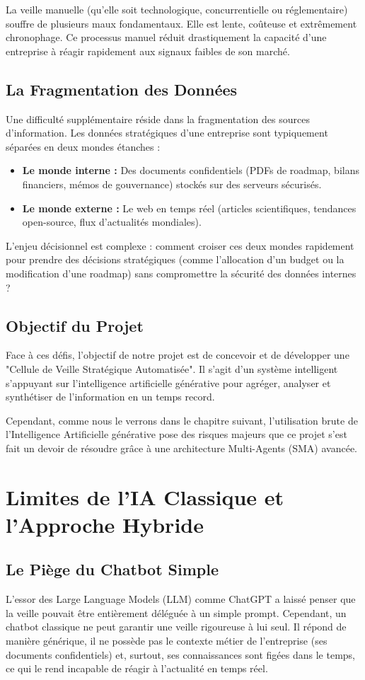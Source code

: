 \documentclass[12pt,a4paper]{report}
\begin{document}
La veille manuelle (qu'elle soit technologique, concurrentielle ou réglementaire) souffre de plusieurs maux fondamentaux. Elle est lente, coûteuse et extrêmement chronophage. Ce processus manuel réduit drastiquement la capacité d'une entreprise à réagir rapidement aux signaux faibles de son marché. 

\section{La Fragmentation des Données}
Une difficulté supplémentaire réside dans la fragmentation des sources d'information. Les données stratégiques d'une entreprise sont typiquement séparées en deux mondes étanches :
\begin{itemize}
    \item \textbf{Le monde interne :} Des documents confidentiels (PDFs de roadmap, bilans financiers, mémos de gouvernance) stockés sur des serveurs sécurisés.
    \item \textbf{Le monde externe :} Le web en temps réel (articles scientifiques, tendances open-source, flux d'actualités mondiales).
\end{itemize}

L'enjeu décisionnel est complexe : comment croiser ces deux mondes rapidement pour prendre des décisions stratégiques (comme l'allocation d'un budget ou la modification d'une roadmap) sans compromettre la sécurité des données internes ?

\section{Objectif du Projet}
Face à ces défis, l'objectif de notre projet est de concevoir et de développer une "Cellule de Veille Stratégique Automatisée". Il s'agit d'un système intelligent s'appuyant sur l'intelligence artificielle générative pour agréger, analyser et synthétiser de l'information en un temps record. 

Cependant, comme nous le verrons dans le chapitre suivant, l'utilisation brute de l'Intelligence Artificielle générative pose des risques majeurs que ce projet s'est fait un devoir de résoudre grâce à une architecture Multi-Agents (SMA) avancée.

\chapter{Limites de l'IA Classique et l'Approche Hybride}

\section{Le Piège du Chatbot Simple}
L'essor des Large Language Models (LLM) comme ChatGPT a laissé penser que la veille pouvait être entièrement déléguée à un simple prompt. Cependant, un chatbot classique ne peut garantir une veille rigoureuse à lui seul. Il répond de manière générique, il ne possède pas le contexte métier de l'entreprise (ses documents confidentiels) et, surtout, ses connaissances sont figées dans le temps, ce qui le rend incapable de réagir à l'actualité en temps réel.
\end{document}
